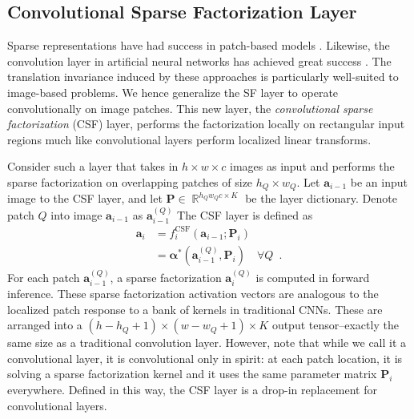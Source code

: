 \documentclass[10pt,twocolumn,letterpaper]{article}
\newcommand{\reals}{\mathop \mathbb{R}}
\renewcommand{\vec}{\mathbf}
\renewcommand{\P}{\vec{P}}
\renewcommand{\a}{\vec{a}}
\newcommand{\balpha}{\boldsymbol{\alpha}}
\newcommand{\fCSF}{^{\text{CSF}}}
\begin{document}

\subsection{Convolutional Sparse Factorization Layer}
\label{sec:csflayer}

Sparse representations have had success in patch-based models \cite{mairal2008sparse}.  
Likewise, the convolution layer in artificial neural networks has achieved 
great success \cite{HeZhReCVPR2016,SiZiICLR2015,KrSuHiNIPS2012}.  The translation invariance induced by these approaches 
is particularly well-suited to image-based problems.  We hence generalize the 
SF layer to operate convolutionally on image patches.  This new layer, the 
\textit{convolutional sparse factorization} (CSF) layer, performs the 
factorization locally on rectangular input regions much like convolutional 
layers perform localized linear transforms.

Consider such a layer that takes in $h\times w\times c$ images as input and performs the sparse factorization on overlapping patches of size $h_Q\times w_Q$. Let $\a_{i-1}$ be an input image to the CSF layer, and let $\P\in\reals^{h_Qw_Qc\times K}$ be the layer dictionary.  Denote patch $Q$ into image $\a_{i-1}$ as $\a_{i-1}^{(Q)}$ The CSF layer is defined as 
%
\begin{align}
    \a_i &= f_i\fCSF(\a_{i-1};\P_i) \\
         &= \balpha^*(\a_{i-1}^{(Q)},\P_i) \quad \forall Q \enspace.\nonumber
\end{align}
%
For each patch $\a_{i-1}^{(Q)}$, a sparse factorization $\a_i^{(Q)}$
is computed in forward inference.  These sparse factorization activation vectors are analogous to the localized patch response to a bank of kernels in traditional CNNs.  These are arranged into a $(h-h_Q+1)\times(w-w_Q+1)\times K$ output tensor--exactly the same size as a traditional convolution layer.  However, note that while we call it a convolutional layer, it is convolutional only in spirit: at each patch location, it is solving a sparse factorization kernel and it uses the same parameter matrix $\P_i$ everywhere.  Defined in this way, the CSF layer is a drop-in replacement for convolutional layers.
\end{document}
